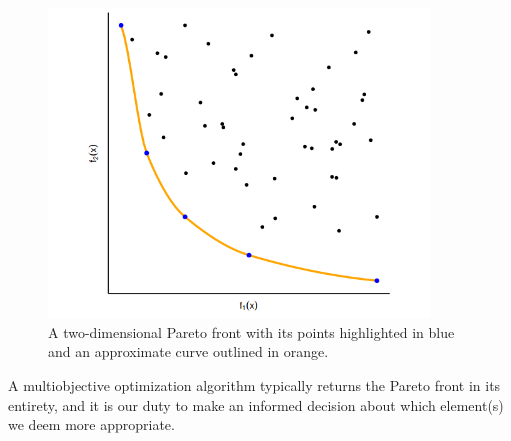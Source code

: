 	\begin{figure}[bth]

        \myfloatalign
        \includegraphics[width=0.9\textwidth]{gfx/ParetoFront.png}
        \caption{A two-dimensional Pareto front with its points highlighted in blue and an approximate curve outlined in orange.}

    \end{figure}

    A multiobjective optimization algorithm typically returns the Pareto front in its entirety, and it is our duty to make an informed decision about which element(s) we deem more appropriate.

\newpage